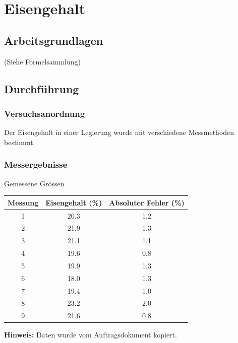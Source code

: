 \section{Eisengehalt}

\subsection{Arbeitsgrundlagen}

(Siehe Formelsammlung)


\subsection{Durchf\"uhrung}

\subsubsection*{Versuchsanordnung}

Der Eisengehalt in einer Legierung wurde mit verschiedene Messmethoden bestimmt.


\subsubsection*{Messergebnisse}

\begin{center}
    \begin{threeparttable}
        \caption{Gemessene Gr\"ossen}
        \begin{tabular}{ccc}
            \toprule
            Messung & Eisengehalt (\%) & Absoluter Fehler (\%) \\
            \midrule
            1   & 20.3  & 1.2 \\
            2   & 21.9  & 1.3 \\
            3   & 21.1  & 1.1 \\
            4   & 19.6  & 0.8 \\
            5   & 19.9  & 1.3 \\
            6   & 18.0  & 1.3 \\
            7   & 19.4  & 1.0 \\
            8   & 23.2  & 2.0 \\
            9   & 21.6  & 0.8 \\
            \bottomrule
        \end{tabular}
        \begin{tablenotes}
            \small
            \item \textbf{Hinweis:} Daten wurde vom Auftragsdokument kopiert.
        \end{tablenotes}
    \end{threeparttable}
\end{center}

